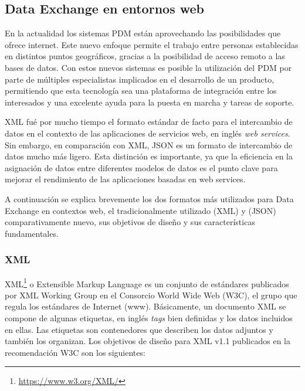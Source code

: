 \subsection{Data Exchange en entornos web}

En la actualidad los sistemas PDM están aprovechando las posibilidades que ofrece internet. Este nuevo enfoque permite el trabajo entre personas establecidas en distintos puntos geográficos, gracias a la posibilidad de acceso remoto a las bases de datos. 
Con estos nuevos sistemas es posible la utilización del PDM por parte de múltiples especialistas implicados en el desarrollo de un producto, permitiendo que esta tecnología sea una plataforma de integración entre los interesados y una excelente ayuda para la puesta en marcha y tareas de soporte.

XML fué por mucho tiempo el formato estándar de facto para el intercambio de datos en el contexto de las aplicaciones de servicios web, en inglés \textit{web services}. Sin embargo, en comparación con XML, JSON es un formato de intercambio de datos mucho más ligero. Esta distinción es importante, ya que la eficiencia en la asignación de datos entre diferentes modelos de datos es el punto clave para mejorar el rendimiento de las aplicaciones basadas en web services. \citep{Zunke2014}

A continuación se explica brevemente los dos formatos más utilizados para Data Exchange en contextos web, el tradicionalmente utilizado (XML) y (JSON) comparativamente nuevo, sus objetivos de diseño y sus características fundamentales.

\subsubsection{XML}

XML\footnote{\url{https://www.w3.org/XML/}} o Extensible Markup Language es un conjunto de estándares publicados por XML Working Group en el Consorcio World Wide Web  (W3C), el grupo que regula los estándares de Internet (www). Básicamente, un documento XML se compone de algunas etiquetas, en inglés \textit{tags} bien definidas y los datos incluidos en ellas. Las etiquetas son contenedores que describen los datos adjuntos y también los organizan. Los objetivos de diseño para XML v1.1 publicados en la recomendación W3C son los siguientes:

